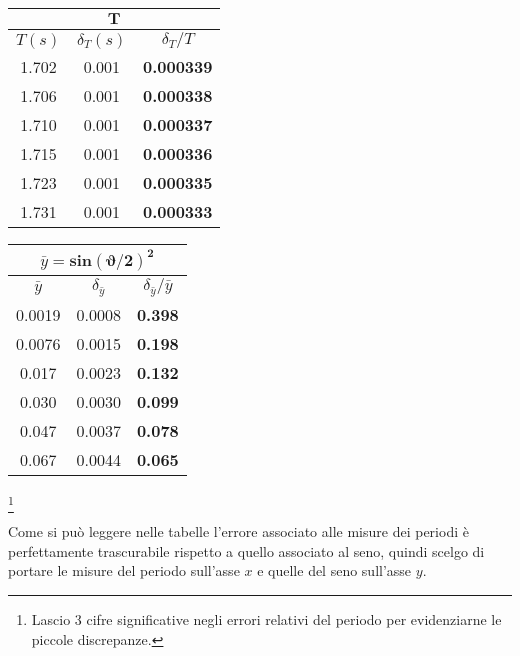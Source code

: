 \documentclass{article}
\begin{document}
	\begin{minipage}{0.5\textwidth}
		\begin{table}[H]
			\centering
			\begin{tabular}{@{}ccc@{}}
				\multicolumn{3}{c}{$\mathbf{T}$} \\ \midrule
				$T(s)$ & $\delta_T (s)$ & $\delta_T / T$ \\ \midrule
				1.702 & 0.001 & \textbf{0.000339} \\
				1.706 & 0.001 & \textbf{0.000338} \\
				1.710 & 0.001 & \textbf{0.000337} \\
				1.715 & 0.001 & \textbf{0.000336} \\
				1.723 & 0.001 & \textbf{0.000335} \\
				1.731 & 0.001 & \textbf{0.000333}  \\ \bottomrule   
			\end{tabular}
		\end{table}
	\end{minipage}
	\begin{minipage}{0.5\textwidth}
		\begin{table}[H]
			\centering
			\begin{tabular}{@{}ccc@{}}
				
				\multicolumn{3}{c}{$\bar{y} = \mathbf{sin{\left(\vartheta/2\right)}^2}$} \\ \midrule
				$\bar{y}$ & $\delta_{\bar{y}}$ & $\delta_{\bar{y}} / \bar{y}$ \\ \midrule
				0.0019&0.0008 & \textbf{0.398} \\
				0.0076&0.0015 & \textbf{0.198}  \\
				0.017&0.0023 & \textbf{0.132}  \\ 
				0.030&0.0030 & \textbf{0.099}  \\
				0.047&0.0037 & \textbf{0.078}  \\
				0.067&0.0044 & \textbf{0.065}  \\ \bottomrule  
			\end{tabular}
		\end{table}
	\end{minipage}
	\footnote{Lascio 3 cifre significative negli errori relativi del periodo per evidenziarne le piccole discrepanze.}
	\vspace{1cm}
	
	\noindent
	Come si può leggere nelle tabelle l'errore associato alle misure dei periodi è perfettamente trascurabile rispetto a quello associato al seno, quindi scelgo di portare le misure del periodo sull'asse $x$ e quelle del seno sull'asse $y$. \\
	
\end{document}
